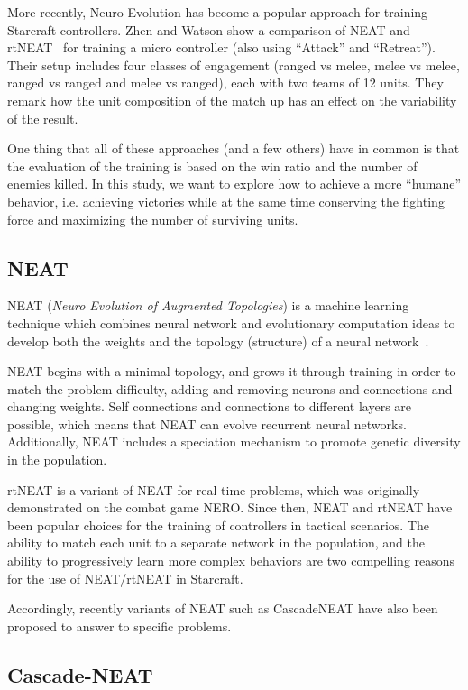 More recently, Neuro Evolution has become a popular approach for
training Starcraft controllers. Zhen and Watson show a comparison of
NEAT and rtNEAT~\cite{Zhen13NeuroEvoSC} for training a micro controller (also
using ``Attack'' and ``Retreat''). Their setup includes four classes
of engagement (ranged vs melee, melee vs melee, ranged vs ranged and
melee vs ranged), each with two teams of 12 units. They remark how the
unit composition of the match up has an effect on the variability of
the result.

One thing that all of these approaches (and a few others) have in
common is that the evaluation of the training is based on the win
ratio and the number of enemies killed. In this study, we want to
explore how to achieve a more ``humane'' behavior, i.e. achieving
victories while at the same time conserving the fighting force and
maximizing the number of surviving units.

\subsection{NEAT}\label{subsec:neat}

NEAT (\emph{Neuro Evolution of Augmented Topologies}) is a machine
learning technique which combines neural network and evolutionary
computation ideas to develop both the weights and the topology
(structure) of a neural network~\cite{Stanley02Neat}.

NEAT begins with a minimal topology, and grows it through training in
order to match the problem difficulty, adding and removing neurons and
connections and changing weights. Self connections and connections to
different layers are possible, which means that NEAT can evolve
recurrent neural networks. Additionally, NEAT includes a speciation
mechanism to promote genetic diversity in the population.

rtNEAT is a variant of NEAT for real time problems, which was
originally demonstrated on the combat game NERO. Since then, NEAT and
rtNEAT have been popular choices for the training of controllers in
tactical scenarios. The ability to match each unit to a separate
network in the population, and the ability to progressively learn more
complex behaviors are two compelling reasons for the use of
NEAT/rtNEAT in Starcraft.

Accordingly, recently variants of NEAT such as CascadeNEAT have also
been proposed to answer to specific problems.

\subsection{Cascade-NEAT}\label{subsec:cascade-neat}

